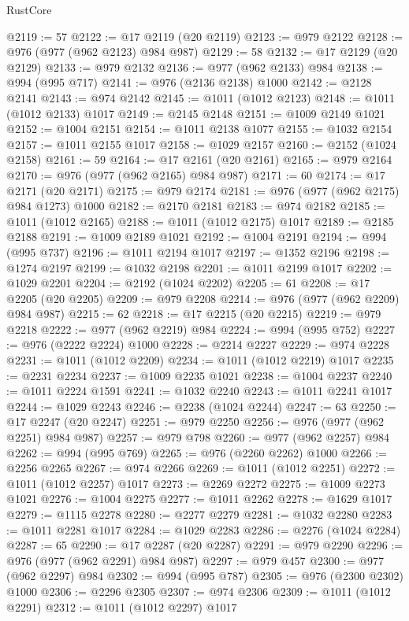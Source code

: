 \begin{lexlean}{RustCore}
\begin{coremodule}
@2119 := 57
@2122 := @17 @2119 (@20 @2119)
@2123 := @979 @2122
@2128 := @976 (@977 (@962 @2123) @984 @987)
@2129 := 58
@2132 := @17 @2129 (@20 @2129)
@2133 := @979 @2132
@2136 := @977 (@962 @2133) @984
@2138 := @994 (@995 @717)
@2141 := @976 (@2136 @2138) @1000
@2142 := @2128 @2141
@2143 := @974 @2142
@2145 := @1011 (@1012 @2123)
@2148 := @1011 (@1012 @2133) @1017
@2149 := @2145 @2148
@2151 := @1009 @2149 @1021
@2152 := @1004 @2151
@2154 := @1011 @2138 @1077
@2155 := @1032 @2154
@2157 := @1011 @2155 @1017
@2158 := @1029 @2157
@2160 := @2152 (@1024 @2158)
@2161 := 59
@2164 := @17 @2161 (@20 @2161)
@2165 := @979 @2164
@2170 := @976 (@977 (@962 @2165) @984 @987)
@2171 := 60
@2174 := @17 @2171 (@20 @2171)
@2175 := @979 @2174
@2181 := @976 (@977 (@962 @2175) @984 @1273) @1000
@2182 := @2170 @2181
@2183 := @974 @2182
@2185 := @1011 (@1012 @2165)
@2188 := @1011 (@1012 @2175) @1017
@2189 := @2185 @2188
@2191 := @1009 @2189 @1021
@2192 := @1004 @2191
@2194 := @994 (@995 @737)
@2196 := @1011 @2194 @1017
@2197 := @1352 @2196
@2198 := @1274 @2197
@2199 := @1032 @2198
@2201 := @1011 @2199 @1017
@2202 := @1029 @2201
@2204 := @2192 (@1024 @2202)
@2205 := 61
@2208 := @17 @2205 (@20 @2205)
@2209 := @979 @2208
@2214 := @976 (@977 (@962 @2209) @984 @987)
@2215 := 62
@2218 := @17 @2215 (@20 @2215)
@2219 := @979 @2218
@2222 := @977 (@962 @2219) @984
@2224 := @994 (@995 @752)
@2227 := @976 (@2222 @2224) @1000
@2228 := @2214 @2227
@2229 := @974 @2228
@2231 := @1011 (@1012 @2209)
@2234 := @1011 (@1012 @2219) @1017
@2235 := @2231 @2234
@2237 := @1009 @2235 @1021
@2238 := @1004 @2237
@2240 := @1011 @2224 @1591
@2241 := @1032 @2240
@2243 := @1011 @2241 @1017
@2244 := @1029 @2243
@2246 := @2238 (@1024 @2244)
@2247 := 63
@2250 := @17 @2247 (@20 @2247)
@2251 := @979 @2250
@2256 := @976 (@977 (@962 @2251) @984 @987)
@2257 := @979 @798
@2260 := @977 (@962 @2257) @984
@2262 := @994 (@995 @769)
@2265 := @976 (@2260 @2262) @1000
@2266 := @2256 @2265
@2267 := @974 @2266
@2269 := @1011 (@1012 @2251)
@2272 := @1011 (@1012 @2257) @1017
@2273 := @2269 @2272
@2275 := @1009 @2273 @1021
@2276 := @1004 @2275
@2277 := @1011 @2262
@2278 := @1629 @1017
@2279 := @1115 @2278
@2280 := @2277 @2279
@2281 := @1032 @2280
@2283 := @1011 @2281 @1017
@2284 := @1029 @2283
@2286 := @2276 (@1024 @2284)
@2287 := 65
@2290 := @17 @2287 (@20 @2287)
@2291 := @979 @2290
@2296 := @976 (@977 (@962 @2291) @984 @987)
@2297 := @979 @457
@2300 := @977 (@962 @2297) @984
@2302 := @994 (@995 @787)
@2305 := @976 (@2300 @2302) @1000
@2306 := @2296 @2305
@2307 := @974 @2306
@2309 := @1011 (@1012 @2291)
@2312 := @1011 (@1012 @2297) @1017

\end{coremodule}
\end{lexlean}
